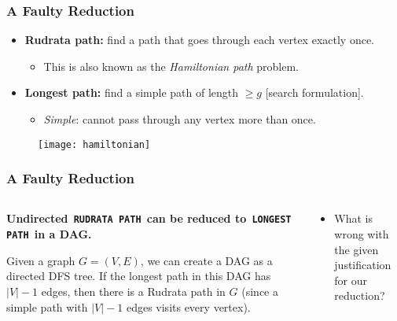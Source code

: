 \documentclass[10pt, xcolor={table, dvipsnames}, t]{beamer}
\begin{document}
\normalframetitle
\begin{frame}
\frametitle{A Faulty Reduction}

\begin{itemize}
\item \textbf{Rudrata path:} find a path that goes through each vertex exactly once.
  \begin{itemize}
  \item This is also known as the \textit{Hamiltonian path} problem.
  \end{itemize}
\item \textbf{Longest path:} find a simple path of length $\geq g$ [search formulation].
  \begin{itemize}
  \item \textit{Simple}: cannot pass through any vertex more than once.
  \end{itemize}
\end{itemize}

\begin{figure}
\texttt{[image: hamiltonian]}
\end{figure}

\end{frame}

\begin{frame}
\frametitle{A Faulty Reduction}
\begin{columns}[T]

\begin{column}{0.48\textwidth}
\small
\textbf{Undirected\texttt{ RUDRATA PATH }can be reduced to\texttt{ LONGEST PATH }in a DAG.}
\newline

Given a graph $G = (V, E)$, we can create a DAG as a directed DFS tree. If the longest path in this DAG has $|V| - 1$ edges, then there is a Rudrata path in $G$ (since a simple path with $|V| - 1$ edges visits every vertex).
\end{column}

\begin{column}{0.48\textwidth}
\small
\begin{itemize}
\item What is wrong with the given justification for our reduction?
\end{itemize}
\end{column}

\end{columns}
\end{frame}
\end{document}
